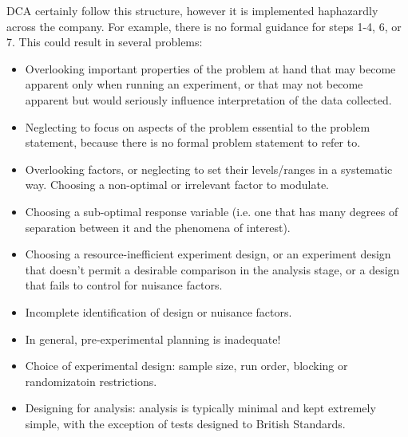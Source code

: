 \documentclass[11pt,a4paper,article]{memoir} %
\begin{document}
DCA certainly follow this structure, however it is implemented haphazardly across the company. For example, there is no formal guidance for steps 1-4, 6, or 7. This could result in several problems:
\begin{itemize}
\item Overlooking important properties of the problem at hand that may become apparent only when running an experiment, or that may not become apparent but would seriously influence interpretation of the data collected.
\item Neglecting to focus on aspects of the problem essential to the problem statement, because there is no formal problem statement to refer to.
\item Overlooking factors, or neglecting to set their levels/ranges in a systematic way. Choosing a non-optimal or irrelevant factor to modulate.
\item Choosing a sub-optimal response variable (i.e. one that has many degrees of separation between it and the phenomena of interest).
\item Choosing a resource-inefficient experiment design, or an experiment design that doesn't permit a desirable comparison in the analysis stage, or a design that fails to control for nuisance factors.
\item Incomplete identification of design or nuisance factors.
\item In general, pre-experimental planning is inadequate!
\item Choice of experimental design: sample size, run order, blocking or randomizatoin restrictions. 
\item Designing for analysis: analysis is typically minimal and kept extremely simple, with the exception of tests designed to British Standards.
\end{itemize}

\end{document}
